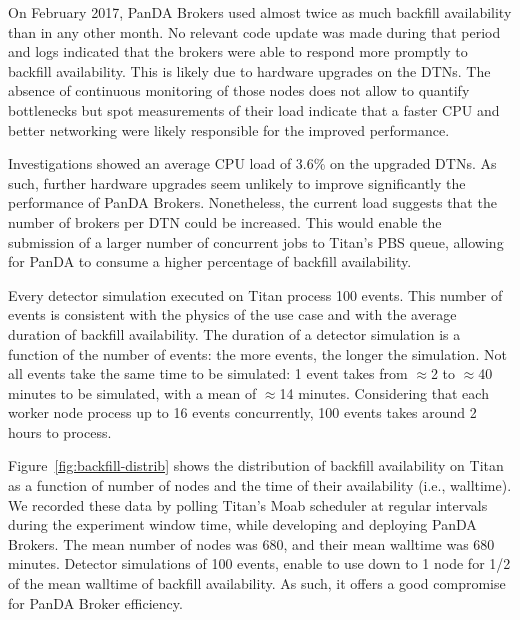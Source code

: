 On February 2017, PanDA Brokers used almost twice as much backfill availability
than in any other month. No relevant code update was made during that period and
logs indicated that the brokers were able to respond more promptly to backfill
availability. This is likely due to hardware upgrades on the DTNs. The absence
of continuous monitoring of those nodes does not allow to quantify bottlenecks
but spot measurements of their load indicate that a faster CPU and better
networking were likely responsible for the improved performance.

Investigations showed an average CPU load of 3.6\% on the upgraded DTNs. As
such, further hardware upgrades seem unlikely to improve significantly the
performance of PanDA Brokers. Nonetheless, the current load suggests that the
number of brokers per DTN could be increased. This would enable the submission
of a larger number of concurrent jobs to Titan's PBS queue, allowing for PanDA
to consume a higher percentage of backfill availability.

Every detector simulation executed on Titan process 100 events. This number of
events is consistent with the physics of the use case and with the average
duration of backfill availability. The duration of a detector simulation is a
function of the number of events: the more events, the longer the simulation.
Not all events take the same time to be simulated:
1 event takes from $\approx$2 to $\approx$40 minutes to be simulated, with a
mean of $\approx$14 minutes. Considering that each worker node process up to 16
events concurrently, 100 events takes around 2 hours to process.


Figure~\ref{fig:backfill-distrib} shows the distribution of backfill
availability on Titan as a function of number of nodes and the time of their
availability (i.e., walltime). We recorded these data by polling Titan's Moab
scheduler at regular intervals during the experiment window time, while
developing and deploying PanDA Brokers. The mean number of nodes was 680, and
their mean walltime was 680 minutes. Detector simulations of 100 events, enable
to use down to 1 node for 1/2 of the mean walltime of backfill availability. As
such, it offers a good compromise for PanDA Broker efficiency.

